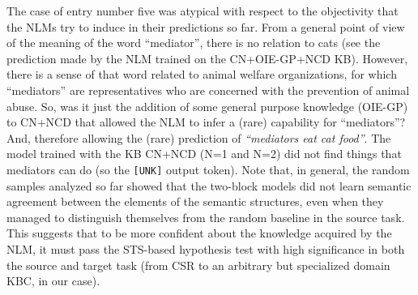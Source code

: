 \documentclass[preprint]{elsarticle}
\begin{document}
The case of entry number five was atypical with respect to the objectivity that the NLMs try to induce in their predictions so far. From a general point of view of the meaning of the word ``mediator'', there is no relation to cats (see the prediction made by the NLM trained on the CN+OIE-GP+NCD KB). However, there is a sense of that word related to animal welfare organizations, for which ``mediators'' are representatives who are concerned with the prevention of animal abuse. So, was it just the addition of some general purpose knowledge (OIE-GP) to CN+NCD that allowed the NLM to infer a (rare) capability for ``mediators''? And, therefore allowing the (rare) prediction of \textit{``mediators eat cat food''}. The model trained with the KB CN+NCD (N=1 and N=2) did not find things that mediators can do (so the \texttt{[UNK]} output token). Note that, in general, the random samples analyzed so far showed that the two-block models did not learn semantic agreement between the elements of the semantic structures, even when they managed to distinguish themselves from the random baseline in the source task. This suggests that to be more confident about the knowledge acquired by the NLM, it must pass the STS-based hypothesis test with high significance in both the source and target task (from CSR to an arbitrary but specialized domain KBC, in our case).
\end{document}
